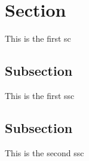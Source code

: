 \section{Section}
This is the first \gls{sc}

\subsection{Subsection}
This is the first \gls{ssc}

\subsection{Subsection}
This is the second \gls{ssc}